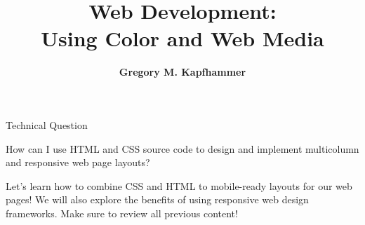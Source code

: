 \documentclass[14pt,aspectratio=169]{beamer}
\title{Web Development: \\ Using Color and Web Media}
\author{{\bf Gregory M. Kapfhammer}}
\institute[shortinst]{{\bf Department of Computer Science, Allegheny College}}
\begin{document}
{
  \begin{frame}
    \titlepage
  \end{frame}
}

%
\begin{frame}{Technical Question}
  \hspace*{.25in}
  \vspace*{.2in}
  \begin{minipage}{5in}
    \begin{center}
      {\large How can I use HTML and CSS source code to design and implement
      multicolumn and responsive web page layouts?}
    \end{center}
  \end{minipage}
  \vspace{2ex}
  \begin{center}
    \small Let's learn how to combine CSS and HTML to mobile-ready layouts for
    our web pages! We will also explore the benefits of using
    responsive web design frameworks. Make sure to review all previous content!\\
  \end{center}
\end{frame}
\end{document}

